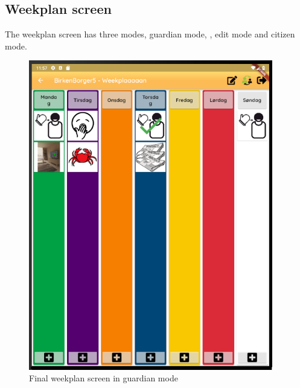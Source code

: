 \subsection{Weekplan screen}
The weekplan screen has three modes, guardian mode, , edit mode and citizen mode. 
\begin{figure}[H]
    \begin{center}
        \includegraphics[width=0.95\textwidth]{figures/FinalScreen/weekplanScreen.png}
    \end{center}
    \caption{Final weekplan screen in guardian mode}
    \label{fig:finalWeekplanGuardianMode}
\end{figure}
